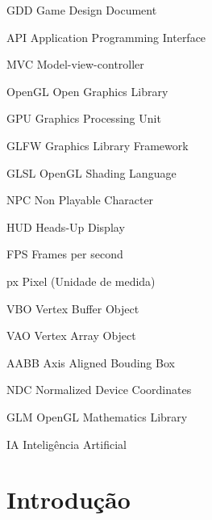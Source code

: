 \documentclass[12pt, 
openright, 
oneside, 
a4paper,    
brazil]{facom-ufu-abntex2}
\begin{document}
\lstlistoflistings
\cleardoublepage


\begin{siglas} 
  \item[GDD] Game Design Document 
  \item[API] Application Programming Interface
  \item[MVC] Model-view-controller
  \item[OpenGL] Open Graphics Library
  \item[GPU] Graphics Processing Unit
  \item[GLFW] Graphics Library Framework
  \item[GLSL] OpenGL Shading Language
  \item[NPC] Non Playable Character
  \item[HUD] Heads-Up Display
  \item[FPS] Frames per second
  \item[px] Pixel (Unidade de medida)
  \item[VBO] Vertex Buffer Object
  \item[VAO] Vertex Array Object
  \item[AABB] Axis Aligned Bouding Box
  \item[NDC] Normalized Device Coordinates
  \item[GLM] OpenGL Mathematics Library
  \item[IA] Inteligência Artificial
\end{siglas}


\tableofcontents*
\cleardoublepage






\chapter{Introdução}
\end{document}

